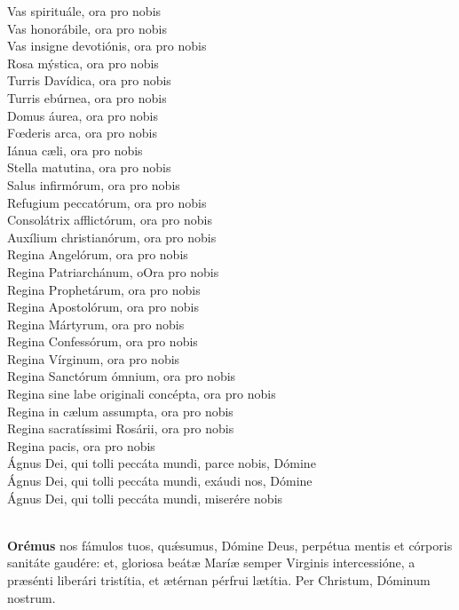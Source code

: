 \documentclass[9pt]{article}
\begin{document}
\begin{multicols*}{2}
    Vas spirituále, ora pro nobis\\
    Vas honorábile, ora pro nobis\\
    Vas insigne devotiónis, ora pro nobis\\
    Rosa mýstica, ora pro nobis\\
    Turris Davídica, ora pro nobis\\
    Turris ebúrnea, ora pro nobis\\
    Domus áurea, ora pro nobis\\
    F{\oe}deris arca, ora pro nobis\\
    Iánua c{\ae}li, ora pro nobis\\
    Stella matutina, ora pro nobis\\
    Salus infirmórum, ora pro nobis\\
    Refugium peccatórum, ora pro nobis\\
    Consolátrix afflictórum, ora pro nobis\\
    Auxílium christianórum, ora pro nobis\\
    Regina Angelórum, ora pro nobis\\
    Regina Patriarchánum, oOra pro nobis\\
    Regina Prophetárum, ora pro nobis\\
    Regina Apostolórum, ora pro nobis\\
    Regina Mártyrum, ora pro nobis\\
    Regina Confessórum, ora pro nobis\\
    Regina Vírginum, ora pro nobis\\
    Regina Sanctórum ómnium, ora pro nobis\\
    Regina sine labe originali concépta, ora pro nobis\\
    Regina in c{\ae}lum assumpta, ora pro nobis\\
    Regina sacratíssimi Rosárii, ora pro nobis\\
    Regina pacis, ora pro nobis\\
    Ágnus Dei, qui tolli peccáta mundi, parce nobis, Dómine\\
    Ágnus Dei, qui tolli peccáta mundi, exáudi nos, Dómine\\
    Ágnus Dei, qui tolli peccáta mundi, miserére nobis\\
    \orapronobissalve\\

    \newpage

    \textbf{Orémus}
     nos fámulos tuos, qu{\'\ae}sumus, Dómine Deus, perpétua mentis et córporis sanitáte gaudére: et, gloriosa beát{\ae}
    Marí{\ae} semper Virginis intercessióne, a pr{\ae}sénti liberári tristítia, et {\ae}térnan pérfrui l{\ae}títia. Per Christum, Dóminum nostrum.
    \\


\end{multicols*}
\end{document}
